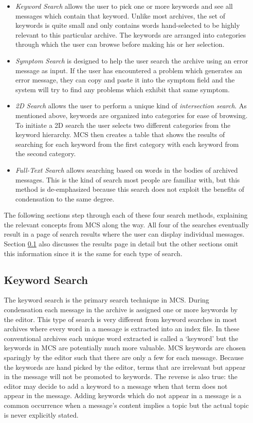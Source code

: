 \begin{itemize}
\item {\it Keyword Search} allows the user to pick one or more keywords and see
  all messages which contain that keyword. Unlike most archives, the set of
  keywords is quite small and only contains words hand-selected to be highly
  relevant to this particular archive. The keywords are arranged into
  categories through which the user can browse before making his or her
  selection.
\item {\it Symptom Search} is designed to help the user search the archive
  using an error message as input. If the user has encountered a problem which
  generates an error message, they can copy and paste it into the symptom field
  and the system will try to find any problems which exhibit that same symptom.
\item {\it 2D Search} allows the user to perform a unique kind of {\it
    intersection search}. As mentioned above, keywords are organized into
  categories for ease of browsing.  To initiate a 2D search the user selects
  two different categories from the keyword hierarchy. MCS then creates a table
  that shows the results of searching for each keyword from the first category
  with each keyword from the second category.
\item {\it Full-Text Search} allows searching based on words in the bodies of
  archived messages. This is the kind of search most people are familiar with,
  but this method is de-emphasized because this search does not exploit the
  benefits of condensation to the same degree.
\end{itemize}

The following sections step through each of these four search methods,
explaining the relevant concepts from MCS along the way. All four of the
searches eventually result in a page of search results where the user can
display individual messages. Section \ref{sec:keyword-search} also discusses
the results page in detail but the other sections omit this information since
it is the same for each type of search.

\subsection{Keyword Search}
\label{sec:keyword-search}
The keyword search is the primary search technique in MCS. During condensation
each message in the archive is assigned one or more keywords by the editor.
This type of search is very different from keyword searches in most archives
where every word in a message is extracted into an index file. In these
conventional archives each unique word extracted is called a `keyword' but the
keywords in MCS are potentially much more valuable.  MCS keywords are chosen
sparingly by the editor such that there are only a few for each message.
Because the keywords are hand picked by the editor, terms that are irrelevant
but appear in the message will not be promoted to keywords.  The reverse is
also true: the editor may decide to add a keyword to a message when that term
does not appear in the message. Adding keywords which do not appear in a
message is a common occurrence when a message's content implies a topic but the
actual topic is never explicitly stated.

